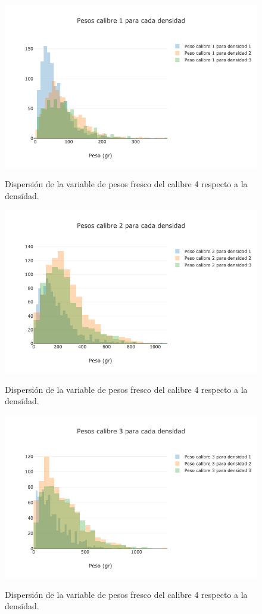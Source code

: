 \begin{figure}[h!]
	\caption{Dispersión de la variable de pesos fresco del calibre 4 respecto a la densidad.}
	\centering
	\includegraphics[scale=0.6]{PD1.png}
	\label{fig:pd1}
\end{figure}

\begin{figure}[h!]
	\caption{Dispersión de la variable de pesos fresco del calibre 4 respecto a la densidad.}
	\centering
	\includegraphics[scale=0.6]{PD2.png}
	\label{fig:pd2}
\end{figure}

\begin{figure}[h!]
	\caption{Dispersión de la variable de pesos fresco del calibre 4 respecto a la densidad.}
	\centering
	\includegraphics[scale=0.6]{PD3.png}
	\label{fig:pd3}
\end{figure}

